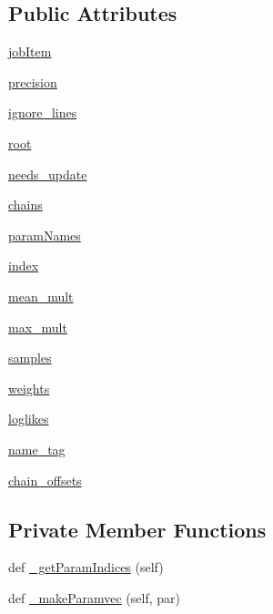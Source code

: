 \subsection*{Public Attributes}
\begin{DoxyCompactItemize}
\item 
\mbox{\hyperlink{classgetdist_1_1chains_1_1Chains_a0437ab45f665cbdd53ae01c4b91fd797}{job\+Item}}
\item 
\mbox{\hyperlink{classgetdist_1_1chains_1_1Chains_a3a9919a141e067468589accd54898913}{precision}}
\item 
\mbox{\hyperlink{classgetdist_1_1chains_1_1Chains_a323e8881d193a20848436d300273d421}{ignore\+\_\+lines}}
\item 
\mbox{\hyperlink{classgetdist_1_1chains_1_1Chains_ae8dd7bf3c841a906ae7d6b3c83326c75}{root}}
\item 
\mbox{\hyperlink{classgetdist_1_1chains_1_1Chains_afeba08b5059e782d6f63ed5e3bd4ae93}{needs\+\_\+update}}
\item 
\mbox{\hyperlink{classgetdist_1_1chains_1_1Chains_a736853e597f290de361a349a8c452649}{chains}}
\item 
\mbox{\hyperlink{classgetdist_1_1chains_1_1Chains_a89262f1797ad79a95ac5a5b39f46962b}{param\+Names}}
\item 
\mbox{\hyperlink{classgetdist_1_1chains_1_1Chains_a0f9fc3c48f94d1ad9977e7028b27f451}{index}}
\item 
\mbox{\hyperlink{classgetdist_1_1chains_1_1Chains_ae936925459f75aea5f744725a1910336}{mean\+\_\+mult}}
\item 
\mbox{\hyperlink{classgetdist_1_1chains_1_1Chains_ab2ba3897a53537de4bcc31100d603195}{max\+\_\+mult}}
\item 
\mbox{\hyperlink{classgetdist_1_1chains_1_1Chains_aa320f1ef8d0d118dd6e328c7a00fdb52}{samples}}
\item 
\mbox{\hyperlink{classgetdist_1_1chains_1_1Chains_a3a9751f705a3a6d28439a4011060f6f8}{weights}}
\item 
\mbox{\hyperlink{classgetdist_1_1chains_1_1Chains_a0c271f2179e6b1f09977ee08b649e34a}{loglikes}}
\item 
\mbox{\hyperlink{classgetdist_1_1chains_1_1Chains_a243759d3413f4aa7b4d1b46a90599c3d}{name\+\_\+tag}}
\item 
\mbox{\hyperlink{classgetdist_1_1chains_1_1Chains_a8722e59c186cf2044878b23a86607b1a}{chain\+\_\+offsets}}
\end{DoxyCompactItemize}
\subsection*{Private Member Functions}
\begin{DoxyCompactItemize}
\item 
def \mbox{\hyperlink{classgetdist_1_1chains_1_1Chains_a3396bdca18b18c9a9ebb14b61b6bd4ce}{\+\_\+get\+Param\+Indices}} (self)
\item 
def \mbox{\hyperlink{classgetdist_1_1chains_1_1Chains_a356b9768604fcc93660fa92170d7857a}{\+\_\+make\+Paramvec}} (self, par)
\end{DoxyCompactItemize}


